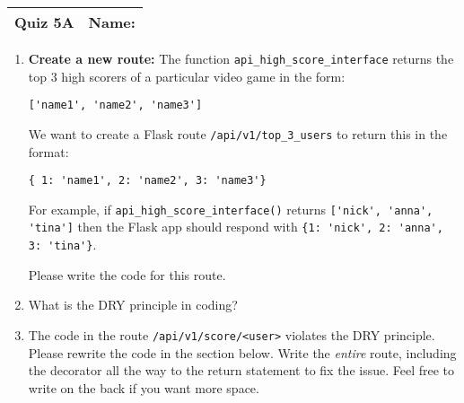 \documentclass[11pt]{article}
\begin{document}
\clearpage

\begin{tabularx}{\textwidth}{l|X}
\textbf{Quiz 5A} &   \textbf{Name: } \\
\hline
\end{tabularx}

\vspace{1cm}

\begin{enumerate}
\item {\bf Create a new route:} The function \texttt{api\_high\_score\_interface} returns the top 3 high scorers of a particular video game in the form:
\begin{verbatim}
['name1', 'name2', 'name3']
\end{verbatim}

We want to create a Flask route \texttt{/api/v1/top\_3\_users} to return this in the format:

\begin{verbatim}
{ 1: 'name1', 2: 'name2', 3: 'name3'}
\end{verbatim}

For example, if \texttt{api\_high\_score\_interface()} returns \verb|['nick', 'anna', 'tina']| then the Flask app should respond with \verb|{1: 'nick', 2: 'anna', 3: 'tina'}|.

Please write the code for this route.

\vspace{6cm}

\item What is the DRY principle in coding?
\vspace{1cm}
\item The code in the route \texttt{/api/v1/score/<user>} violates the DRY principle. Please rewrite the code in the section below. Write the {\it entire} route, including the decorator all the way to the return statement to fix the issue. Feel free to write on the back if you want more space.

\end{enumerate}
\end{document}
